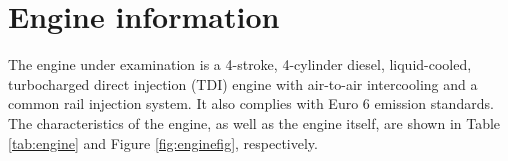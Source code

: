 \documentclass{report}
\begin{document}
\section{%
Engine information}
The engine under examination is a 4-stroke, 4-cylinder diesel, liquid-cooled, turbocharged direct injection (TDI) engine with air-to-air intercooling and a common rail injection system. It also complies with Euro 6 emission standards. The characteristics of the engine, as well as the engine itself, are shown in Table \ref{tab:engine} and Figure \ref{fig:enginefig}, respectively.
\end{document}

